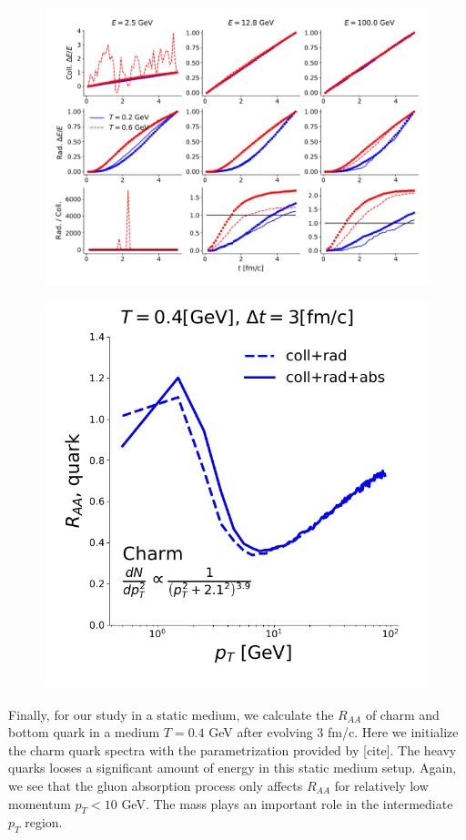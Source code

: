 \documentclass[aps, prc, reprint, amsmath, groupedaddress, nofootinbib]{revtex4-1}
\begin{document}
\begin{figure}
\includegraphics[width=\textwidth]{L_Eloss.pdf}
\caption{}\label{plots:dE-L}
\end{figure}

\begin{figure}
\includegraphics[width=\columnwidth]{BoxRaa.pdf}
\end{figure}

Finally, for our study in a static medium, we calculate the $R_{AA}$ of charm and bottom quark in a medium $T=0.4$ GeV after evolving $3$ fm/c.
Here we initialize the charm quark spectra with the parametrization provided by [cite].
The heavy quarks looses a significant amount of energy in this static medium setup.
Again, we see that the gluon absorption process only affects $R_{AA}$ for relatively low momentum $p_T < 10$ GeV.
The mass plays an important role in the intermediate $p_T$ region.
\end{document}
